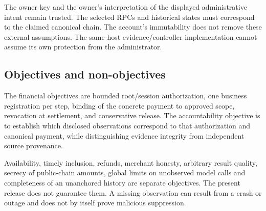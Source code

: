 The owner key and the owner's interpretation of the displayed administrative intent remain trusted. The selected RPCs and historical states must correspond to the claimed canonical chain. The account's immutability does not remove these external assumptions. The same-host evidence/controller implementation cannot assume its own protection from the administrator.

\subsection{Objectives and non-objectives}
The financial objectives are bounded root/session authorization, one business registration per step, binding of the concrete payment to approved scope, revocation at settlement, and conservative release. The accountability objective is to establish which disclosed observations correspond to that authorization and canonical payment, while distinguishing evidence integrity from independent source provenance.

Availability, timely inclusion, refunds, merchant honesty, arbitrary result quality, secrecy of public-chain amounts, global limits on unobserved model calls and completeness of an unanchored history are separate objectives. The present release does not guarantee them. A missing observation can result from a crash or outage and does not by itself prove malicious suppression.
